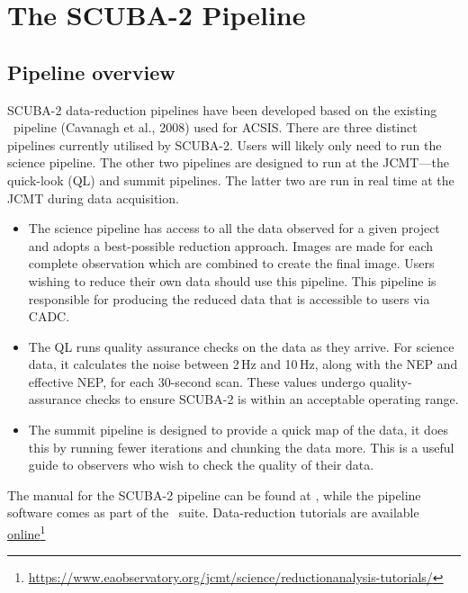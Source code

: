 \chapter{The SCUBA-2 Pipeline}
\label{sec:pipe}

\section{Pipeline overview}

SCUBA-2 data-reduction pipelines have been developed based on the
existing \oracdr\ pipeline (Cavanagh et al., 2008\cite{oracdr}) used
for ACSIS. There are three distinct pipelines currently utilised by
SCUBA-2. Users will likely only need to run the science pipeline. The
other two pipelines are designed to run at the JCMT---the quick-look (QL) and
summit pipelines. The latter two are run in real time at the JCMT
during data acquisition.

\begin{itemize}
\item The science pipeline has access to all the data observed for a
given project and adopts a best-possible reduction approach. Images are
made for each complete observation which are combined to create the final
image. Users wishing to reduce their own data should use this pipeline.
This pipeline is responsible for producing the reduced data that is
accessible to users via CADC.
\item The QL runs quality assurance checks on the data as they arrive.
For science data, it calculates the noise between 2\,Hz and 10\,Hz,
along with the NEP and effective NEP, for each 30-second scan. These
values undergo quality-assurance checks to ensure SCUBA-2 is within
an acceptable operating range.
\item The summit pipeline is designed to provide a quick map of the
data, it does this by running fewer iterations and chunking the data
more. This is a useful guide to observers who wish to check the
quality of their data.

\end{itemize}

The manual for the SCUBA-2 pipeline can be found at \pipelinesun,
while the pipeline software comes as part of the \starlink\ suite.
Data-reduction tutorials are available
\href{https://www.eaobservatory.org/jcmt/science/reductionanalysis-tutorials/}{online}\footnote{
\url{https://www.eaobservatory.org/jcmt/science/reductionanalysis-tutorials/}}

